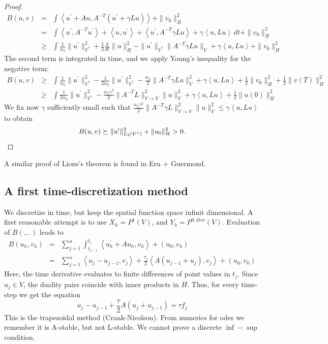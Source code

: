 \begin{proof}
\begin{eqnarray*}
B(u,v) & = & \int \left< u^\prime + A u, A^{-T} (u^\prime + \gamma L u) \right> + \| v_0\|_H^2 \\
& = & \int \left< u^\prime, A^{-T} u^\prime\right> + \left< u, u^ \prime\right> + \left< u^\prime, A^{-T } \gamma L u \right> + \gamma \left< u, L u \right> \, dt +  \| v_0 \|_H^2 \\
& \geq & \int \tfrac{1}{\alpha_2} \| u^\prime \|_{V^\ast}^2 + \tfrac{1}{2} \tfrac{d}{dt} \| u \|_H^2 - \| u^\prime \|_{V^\ast} \| A^{-T} \gamma L u \|_V + \gamma \left< u, L u \right> + \| v_0 \|_{H}^2
\end{eqnarray*}
The second term is integrated in time, and we apply Young's inequality for the negative term:
\begin{eqnarray*}
B(u,v) & \geq & \int \tfrac{1}{\alpha_2} \| u^\prime \|_{V^\ast}^2  - \tfrac{1}{2\alpha_2}\| u^\prime \|_{V^\ast}^2 - \tfrac{\alpha_2}{2} \| A^{-T} \gamma L u \|_V^2 + \gamma \left< u, L u \right> + \tfrac{1}{2} \| v_0 \|_{H}^2 + \tfrac{1}{2}  \| v(T) \|_H^2 \\
& \geq &  \int \tfrac{1}{2 \alpha_2} \| u^\prime \|_{V^\ast}^2  - \tfrac{\alpha_2 \gamma^2}{2} \| A^{-T} L \|_{V \rightarrow V}^2  \| u \|_V^2 + \gamma \left< u, L u \right> + \tfrac{1}{2} \| u(0) \|_{H}^2 
\end{eqnarray*}
We fix now $\gamma$ sufficiently small such that $\tfrac{\alpha_2 \gamma^2}{2} \| A^{-T} \gamma L \|_{V \rightarrow V}^2  \| u \|_V^2 \leq \gamma \left< u, L u \right>$ to obtain
$$
B(u,v) \succeq \| u^\prime \|_{L_2(V^\ast)}^2 + \| u_0 \|_H^2 > 0.
$$
\end{proof}
A similar proof of Lions's theorem is found in Ern + Guermond.
\subsection{A first time-discretization method}
We discretize in time, but keep the spatial function space infinit dimensional. 
A first reasonable attempt is to use $X_h = P^1(V)$, and $Y_h = P^{0,disc}(V)$. 
Evaluation of $B(.,.)$ leads to
\begin{eqnarray*}
B(u_h, v_h) & = & \sum_{j=1}^n \int_{t_{j-1}}^{t_j} \left< u_h^\prime + A u_h , v_h \right> + (u_0, v_h)  \\
& = & \sum_{j=1}^n \left< u_j - u_{j-1}, v_j \right> + \tfrac{\tau_j}{2} \left<A (u_{j-1} + u_j), v_j \right> + (u_0, v_0)
\end{eqnarray*}
Here, the time derivative evaluates to finite differences of point values in $t_j$. Since $u_j \in V$, the duality pairs
coincide with inner products in $H$. Thus, for every time-step we get the equation
$$
u_j - u_{j-1} + \frac{\tau}{2} A (u_j + u_{j-1}) = \tau f_j
$$
This is the trapezoidal method (Crank-Nicolson). From numerics for odes we remember it is A-stable, but not L-stable.
We cannot prove a discrete $\inf-\sup$ condition.

